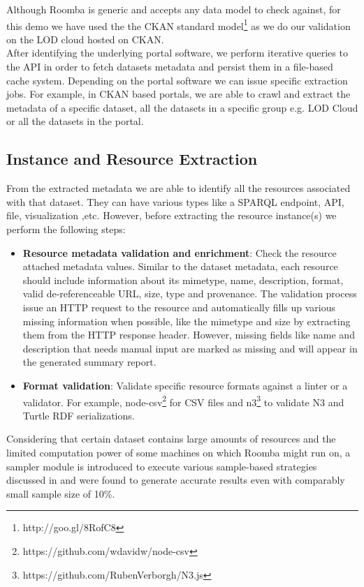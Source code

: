 \documentclass{sig-alternate}
\begin{document}
Although Roomba is generic and accepts any data model to check against, for this demo we have used the the CKAN standard model\footnote{http://goo.gl/8RofC8} as we do our validation on the LOD cloud hosted on CKAN.\\

After identifying the underlying portal software, we perform iterative queries to the API in order to fetch datasets metadata and persist them in a file-based cache system.
Depending on the portal software we can issue specific extraction jobs. For example, in CKAN based portals, we are able to crawl and extract the metadata of a specific dataset, all the datasets in a specific group e.g. LOD Cloud or all the datasets in the portal.

\subsection{Instance and Resource Extraction}

From the extracted metadata we are able to identify all the resources associated with that dataset. They can have various types like a SPARQL endpoint, API, file, visualization ,etc. However, before extracting the resource instance(s) we perform the following steps:

\begin{itemize}
  \item \textbf{Resource metadata validation and enrichment}: Check the resource attached metadata values. Similar to the dataset metadata, each resource should include information about its mimetype, name, description, format, valid de-referenceable URL, size, type and provenance. The validation process issue an HTTP request to the resource and automatically fills up various missing information when possible, like the mimetype and size by extracting them from the HTTP response header. However, missing fields like name and description that needs manual input are marked as missing and will appear in the generated summary report.
  \item \textbf{Format validation}: Validate specific resource formats against a linter or a validator. For example, node-csv\footnote{https://github.com/wdavidw/node-csv} for CSV files and n3\footnote{https://github.com/RubenVerborgh/N3.js} to validate N3 and Turtle RDF serializations.
\end{itemize}

Considering that certain dataset contains large amounts of resources and the limited computation power of some machines on which Roomba might run on, a sampler module is introduced to execute various sample-based strategies discussed in \cite{scalableApproach} and were found to generate accurate results even with comparably small sample size of 10\%.
\end{document}
